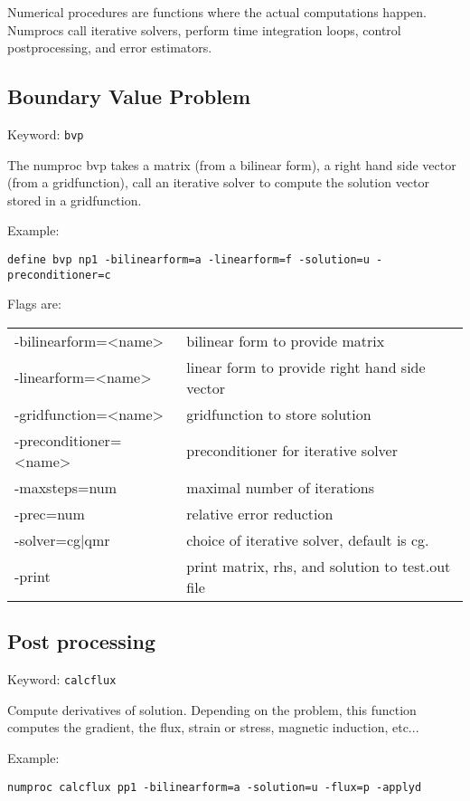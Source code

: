 \documentclass[12pt]{book}
\begin{document}
Numerical procedures are functions where the actual computations happen.
Numprocs call iterative solvers, perform time integration loops, 
control postprocessing, and error estimators.

\subsection{Boundary Value Problem}

Keyword: {\tt bvp}

The numproc bvp takes a matrix (from a bilinear form), a right hand side
vector (from a gridfunction), call an iterative solver to compute the
solution vector stored in a gridfunction.

Example:
\begin{verbatim}
define bvp np1 -bilinearform=a -linearform=f -solution=u -preconditioner=c
\end{verbatim}

Flags are:
\begin{tabular}{ll}
\hline
-bilinearform=<name> & bilinear form to provide matrix \\
-linearform=<name> & linear form to provide right hand side vector\\
-gridfunction=<name> & gridfunction to store solution \\
-preconditioner=<name> & preconditioner for iterative solver \\
-maxsteps=num & maximal number of iterations \\
-prec=num & relative error reduction \\
-solver={cg|qmr} & choice of iterative solver, default is cg. \\
-print     & print matrix, rhs, and solution to test.out file \\
\hline
\end{tabular}

\subsection{Post processing}

Keyword: {\tt calcflux}

Compute derivatives of solution. Depending on the problem, this function
computes the gradient, the flux, strain or stress, magnetic induction, etc...

Example:
\begin{verbatim}
numproc calcflux pp1 -bilinearform=a -solution=u -flux=p -applyd
\end{verbatim}
\end{document}
